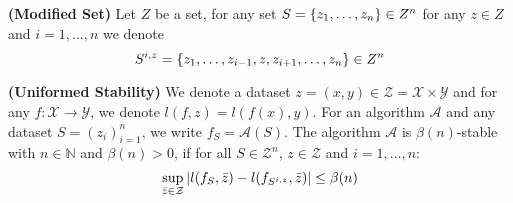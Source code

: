 \begin{definition}{\textbf{(Modified Set)}}
    Let $Z$ be a set, for any set $S=\left\{ z_1,\dots,z_n \right\}\in Z^n$ for any $z\in Z$ and $i = 1,\dots,n$ we denote
    \begin{equation*}
        S^{i, z} = \left\{ z_1, \dots, z_{i-1}, z, z_{i+1},\dots, z_n \right\}\in Z^n
    \end{equation*}
\end{definition}

\begin{definition}{\textbf{(Uniformed Stability)}}
    We denote a dataset $z = (x, y) \in \mathcal{Z} = \mathcal{X}\times\mathcal{Y}$ and for any $f : \mathcal{X}\rightarrow \mathcal{Y}$, we denote $l(f, z) = l(f(x), y)$. For an algorithm $\mathcal{A}$ and any dataset $S=(z_i)^n_{i=1}$, we write $f_S = \mathcal{A}(S)$. The algorithm $\mathcal{A}$ is $\beta(n)$-stable with $n\in\mathbb{N}$ and $\beta(n)>0$, if for all $S\in\mathcal{Z}^n$, $z\in\mathcal{Z}$ and $i=1,\dots,n$:
    \begin{equation*}
        \sup_{\bar{z}\in\mathcal{Z}}\left| l(f_S, \bar{z}) - l(f_{S^{i, z}}, \bar{z}) \right| \le \beta(n)
    \end{equation*}
\end{definition}

